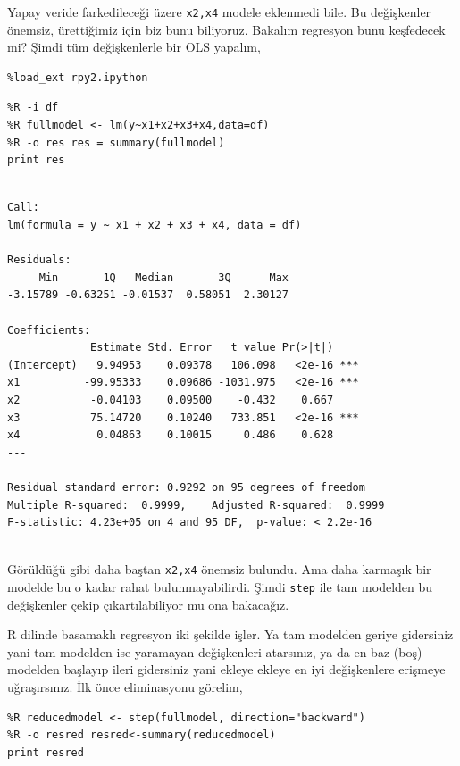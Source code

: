 \documentclass[12pt,fleqn]{article}\usepackage{../../common}
\begin{document}
Yapay veride farkedileceği üzere \verb!x2,x4! modele eklenmedi bile. Bu
değişkenler önemsiz, ürettiğimiz için biz bunu biliyoruz. Bakalım regresyon bunu
keşfedecek mi? Şimdi tüm değişkenlerle bir OLS yapalım,

\begin{verbatim}
%load_ext rpy2.ipython
\end{verbatim}

\begin{verbatim}
%R -i df
%R fullmodel <- lm(y~x1+x2+x3+x4,data=df)
%R -o res res = summary(fullmodel)
print res
\end{verbatim}

\begin{verbatim}

Call:
lm(formula = y ~ x1 + x2 + x3 + x4, data = df)

Residuals:
     Min       1Q   Median       3Q      Max 
-3.15789 -0.63251 -0.01537  0.58051  2.30127 

Coefficients:
             Estimate Std. Error   t value Pr(>|t|)    
(Intercept)   9.94953    0.09378   106.098   <2e-16 ***
x1          -99.95333    0.09686 -1031.975   <2e-16 ***
x2           -0.04103    0.09500    -0.432    0.667    
x3           75.14720    0.10240   733.851   <2e-16 ***
x4            0.04863    0.10015     0.486    0.628    
---

Residual standard error: 0.9292 on 95 degrees of freedom
Multiple R-squared:  0.9999,	Adjusted R-squared:  0.9999 
F-statistic: 4.23e+05 on 4 and 95 DF,  p-value: < 2.2e-16


\end{verbatim}

Görüldüğü gibi daha baştan \verb!x2,x4! önemsiz bulundu. Ama daha karmaşık bir
modelde bu o kadar rahat bulunmayabilirdi. Şimdi \verb!step! ile tam modelden bu
değişkenler çekip çıkartılabiliyor mu ona bakacağız.

R dilinde basamaklı regresyon iki şekilde işler. Ya tam modelden geriye
gidersiniz yani tam modelden ise yaramayan değişkenleri atarsınız, ya da en baz
(boş) modelden başlayıp ileri gidersiniz yani ekleye ekleye en iyi değişkenlere
erişmeye uğraşırsınız. İlk önce eliminasyonu görelim,

\begin{verbatim}
%R reducedmodel <- step(fullmodel, direction="backward")
%R -o resred resred<-summary(reducedmodel)
print resred
\end{verbatim}
\end{document}

